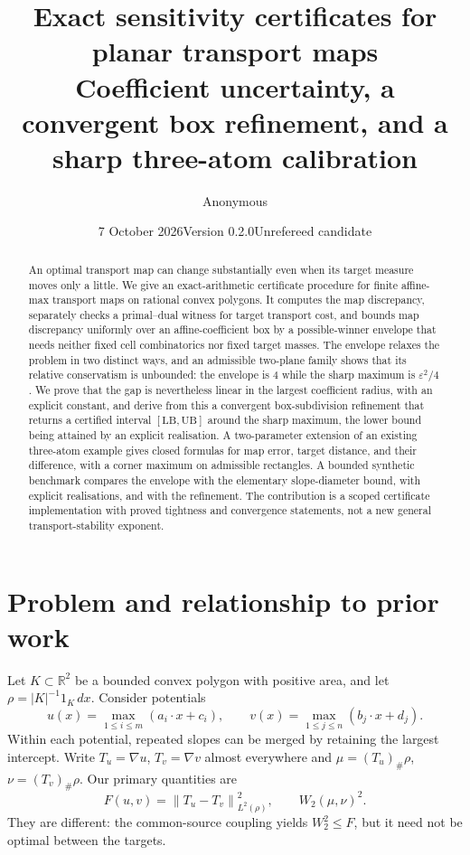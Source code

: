 \documentclass[11pt]{article}
\title{Exact sensitivity certificates for planar transport maps\\[4pt]
\large Coefficient uncertainty, a convergent box refinement, and a sharp three-atom calibration}
\author{Anonymous}
\date{7 October 2026\quad Version 0.2.0\quad Unrefereed candidate}
\theoremstyle{remark}
\newcommand{\R}{\mathbb R}
\newcommand{\norm}[1]{\left\lVert#1\right\rVert}
\begin{document}
\maketitle
\begin{abstract}
An optimal transport map can change substantially even when its target measure
moves only a little. We give an exact-arithmetic certificate procedure for
finite affine-max transport maps on rational convex polygons. It computes the
map discrepancy, separately checks a primal--dual witness for target transport
cost, and bounds map discrepancy uniformly over an affine-coefficient box by a
possible-winner envelope that needs neither fixed cell combinatorics nor fixed
target masses. The envelope relaxes the problem in two distinct ways, and an
admissible two-plane family shows that its relative conservatism is unbounded:
the envelope is $4$ while the sharp maximum is $\varepsilon^2/4$. We prove that
the gap is nevertheless linear in the largest coefficient radius, with an
explicit constant, and derive from this a convergent box-subdivision refinement
that returns a certified interval $[\mathrm{LB},\mathrm{UB}]$ around the sharp
maximum, the lower bound being attained by an explicit realisation. A
two-parameter extension of an existing three-atom example gives closed formulas
for map error, target distance, and their difference, with a corner maximum on
admissible rectangles. A bounded synthetic benchmark compares the envelope with
the elementary slope-diameter bound, with explicit realisations, and with the
refinement. The contribution is a scoped certificate implementation with proved
tightness and convergence statements, not a new general transport-stability
exponent.
\end{abstract}

\section{Problem and relationship to prior work}
Let $K\subset\R^2$ be a bounded convex polygon with positive area, and let
$\rho=|K|^{-1}1_K\,dx$. Consider potentials
\[
 u(x)=\max_{1\leq i\leq m}(a_i\cdot x+c_i),\qquad
 v(x)=\max_{1\leq j\leq n}(b_j\cdot x+d_j).
\]
Within each potential, repeated slopes can be merged by retaining the largest
intercept. Write $T_u=\nabla u$, $T_v=\nabla v$ almost everywhere and
$\mu=(T_u)_\#\rho$, $\nu=(T_v)_\#\rho$. Our primary quantities are
\[
 F(u,v)=\norm{T_u-T_v}_{L^2(\rho)}^2,
 \qquad W_2(\mu,\nu)^2.
\]
They are different: the common-source coupling yields $W_2^2\leq F$, but it
need not be optimal between the targets.
\end{document}
